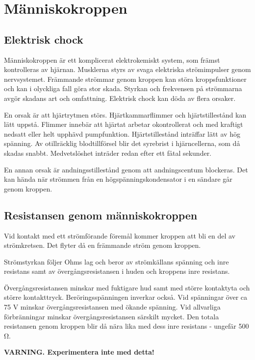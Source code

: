 \section{Människokroppen}

\subsection{Elektrisk chock}

Människokroppen är ett komplicerat elektrokemiskt system, som främst
kontrolleras av hjärnan. Musklerna styrs av svaga elektriska
strömimpulser genom nervsystemet. Främmande strömmar genom kroppen kan
störa kroppsfunktioner och kan i olyckliga fall göra stor
skada. Styrkan och frekvensen på strömmarna avgör skadans art och
omfattning.  Elektrisk chock kan döda av flera orsaker.

En orsak är att hjärtrytmen störs. Hjärtkammarflimmer och
hjärtstillestånd kan lätt uppstå. Flimmer innebär att hjärtat arbetar
okontrollerat och med kraftigt nedsatt eller helt upphävd
pumpfunktion. Hjärtstillestånd inträffar lätt av hög spänning. Av
otillräcklig blodtillförsel blir det syrebrist i hjärncellerna, som då
skadas snabbt. Medvetslöshet inträder redan efter ett fåtal sekunder.

En annan orsak är andningsstillestånd genom att andningscentum
blockeras. Det kan hända när strömmen från en högspänningskondensator
i en sändare går genom kroppen.

\subsection{Resistansen genom människokroppen}

Vid kontakt med ett strömförande föremål kommer kroppen att bli en del
av strömkretsen. Det flyter då en främmande ström genom kroppen.

Strömstyrkan följer Ohms lag och beror av strömkällans spänning och
inre resistans samt av övergångsresistansen i huden och kroppens inre
resistans.

Övergångsresistansen minskar med fuktigare hud samt med större
kontaktyta och större kontakttryck. Beröringsspänningen inverkar
också. Vid spänningar över ca 75 V minskar övergångsresistansen med
ökande spänning. Vid allvarliga förbränningar minskar
övergångsresistansen särskilt mycket.  Den totala resistansen genom
kroppen blir då nära lika med dess inre resistans - ungefär 500 Ω.

\textbf{VARNING. Experimentera inte med detta!}


